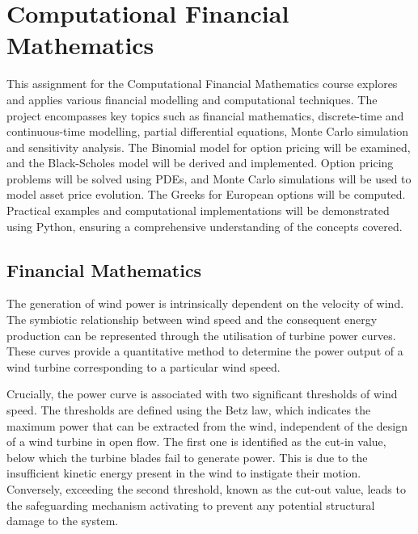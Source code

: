 

%

\chapter{Computational Financial Mathematics}
\label{ch:comp_fin_math}

    This assignment for the Computational Financial Mathematics course explores and applies various financial
    modelling and computational techniques.
    The project encompasses key topics such as financial mathematics, discrete-time and continuous-time modelling,
    partial differential equations, Monte Carlo simulation and sensitivity analysis.
    The Binomial model for option pricing will be examined, and the Black-Scholes model will be derived and implemented.
    Option pricing problems will be solved using PDEs,
    and Monte Carlo simulations will be used to model asset price evolution.
    The Greeks for European options will be computed.
    Practical examples and computational implementations will be demonstrated using Python,
    ensuring a comprehensive understanding of the concepts covered.


\section{Financial Mathematics}
    \label{sec:fin_math}

    The generation of wind power is intrinsically dependent on the velocity of wind.
    The symbiotic relationship between wind speed and the consequent energy production can be represented through the
    utilisation of turbine power curves.
    These curves provide a quantitative method
    to determine the power output of a wind turbine corresponding to a particular wind speed.

    Crucially, the power curve is associated with two significant thresholds of wind speed.
    The thresholds are defined using the Betz law, which indicates the maximum power that can be extracted from the wind,
    independent of the design of a wind turbine in open flow.
    The first one is identified as the cut-in value, below which the turbine blades fail to generate power.
    This is due to the insufficient kinetic energy present in the wind to instigate their motion.
    Conversely, exceeding the second threshold, known as the cut-out value,
    leads to the safeguarding mechanism activating to prevent any potential structural damage to the system.

